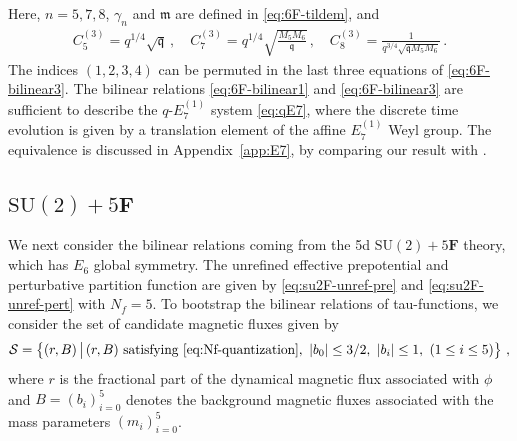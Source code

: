 \documentclass[11pt, a4paper]{article}
\theoremstyle{definition}
\begin{document}
Here, $ n=5,7,8 $, $ \gamma_n $ and $ \mathfrak{m} $ are defined in \eqref{eq:6F-tildem}, and
\begin{gather}
    C_5^{(3)} = q^{1/4} \sqrt{\mathfrak{q}} \, , \quad
    C_7^{(3)} = q^{1/4} \sqrt{\frac{M_5 M_6}{\mathfrak{q}}} \, , \quad
    C_8^{(3)} = \frac{1}{q^{3/4} \sqrt{\mathfrak{q}M_5M_6}} \, .
\end{gather}
The indices $ (1,2,3,4) $ can be permuted in the last three equations of \eqref{eq:6F-bilinear3}. The bilinear relations \eqref{eq:6F-bilinear1} and \eqref{eq:6F-bilinear3} are sufficient to describe the $ q\text{-}E_7^{(1)} $ system \eqref{eq:qE7}, where the discrete time evolution is given by a translation element of the affine $ E_7^{(1)} $ Weyl group. The equivalence is discussed in Appendix~\ref{app:E7}, by comparing our result with \cite{Masuda:2009}.




\subsection{\texorpdfstring{$ \mathrm{SU}(2) + 5\mathbf{F} $}{SU(2) + 5F}}

We next consider the bilinear relations coming from the 5d $ \mathrm{SU}(2)+5\mathbf{F} $ theory, which has $ E_6 $ global symmetry. The unrefined effective prepotential and perturbative partition function are given by \eqref{eq:su2F-unref-pre} and \eqref{eq:su2F-unref-pert} with $ N_f=5 $. To bootstrap the bilinear relations of tau-functions, we consider the set of candidate magnetic fluxes given by
\begin{align}
    \mathcal{S} = \left\{ (r,B) \, \big| \, (r,B) \text{ satisfying \eqref{eq:Nf-quantization}}, \ |b_0| \leq 3/2 , \ |b_i| \leq 1 , \ (1 \leq i \leq 5) \right\} \, ,
\end{align}
where $ r $ is the fractional part of the dynamical magnetic flux associated with $ \phi $ and $ B=(b_i)_{i=0}^5 $ denotes the background magnetic fluxes associated with the mass parameters $ (m_i)_{i=0}^5 $.
\end{document}
